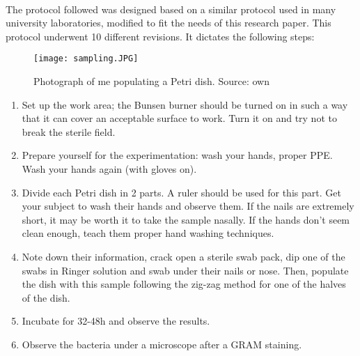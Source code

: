 \paragraph{}The protocol followed was designed based on a similar protocol used in many university laboratories\cite{olearyPracticalHandbookMicrobiology1989}, modified to fit the needs of this research paper. This protocol underwent 10 different revisions. It dictates the following steps: \newline\begin{wrapfigure}{r}{0.4\textwidth}\begin{center}\texttt{[image: sampling.JPG]}\end{center}\caption{Photograph of me populating a Petri dish. Source: own  }\end{wrapfigure}
\begin{enumerate}[label=\arabic*)]
\item Set up the work area; the Bunsen burner should be turned on in such a way that it can cover an acceptable surface to work. Turn it on and try not to break the sterile field.
\item Prepare yourself for the experimentation: wash your hands, proper PPE. Wash your hands again (with gloves on).
\item Divide each Petri dish in 2 parts. A ruler should be used for this part. Get your subject to wash their hands and observe them. If the nails are extremely short, it may be worth it to take the sample nasally. If the hands don't seem clean enough, teach them proper hand washing techniques.
\item Note down their information, crack open a sterile swab pack, dip one of the swabs in Ringer solution and swab under their nails or nose. Then, populate the dish with this sample following the zig-zag method for one of the halves of the dish.
\item Incubate for 32-48h and observe the results.
\item Observe the bacteria under a microscope after a GRAM staining.
\end{enumerate}
